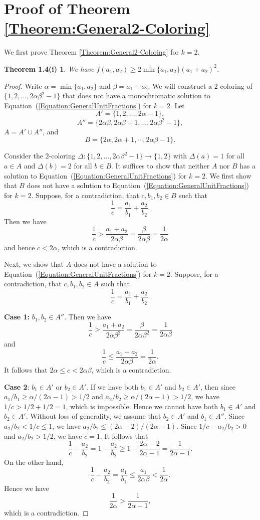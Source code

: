 \documentclass[10pt,a4paper]{amsart}
\newtheorem*{thm1.4PartI}{Theorem 1.4(i)}
\begin{document}
\section{Proof of Theorem \ref{Theorem:General2-Coloring}}\label{Section:GeneralTheorem2Coloring}
We first prove Theorem \ref{Theorem:General2-Coloring} for $k=2$.
\begin{thm1.4PartI}\label{Theorem:General2-Coloring_k=2}
    We have $f(a_1,a_2)\geq2\min\{a_1,a_2\}(a_1+a_2)^2$.
\end{thm1.4PartI}
\begin{proof}
    Write $\alpha=\min\{a_1,a_2\}$ and $\beta=a_1+a_2$. We will construct a $2$-coloring of $\{1,2,\ldots,2\alpha\beta^2-1\}$ that does not have a monochromatic solution to Equation~(\ref{Equation:GeneralUnitFractions}) for $k=2$. Let \[A'=\{1,2,\ldots,2\alpha-1\},\]
    \[
    A''=\{2\alpha\beta,2\alpha\beta+1,\ldots,2\alpha\beta^2-1\},
    \]
    $A=A'\cup A''$, and
    \[
    B=\{2\alpha,2\alpha+1,\cdots,2\alpha\beta-1\}.
    \]
    
    Consider the $2$-coloring $\Delta:\{1,2,\ldots,2\alpha\beta^2-1\}\to\{1,2\}$ with $\Delta(a)=1$ for all $a\in A$ and $\Delta(b)=2$ for all $b\in B$. It suffices to show that neither $A$ nor $B$ has a solution to Equation~(\ref{Equation:GeneralUnitFractions}) for $k=2$. We first show that $B$ does not have a solution to Equation~(\ref{Equation:GeneralUnitFractions}) for $k=2$. Suppose, for a contradiction, that $c,b_1,b_2\in B$ such that
    \[
    \frac{1}{c}=\frac{a_1}{b_1}+\frac{a_2}{b_2}.
    \]
    Then we have
    \[
    \frac{1}{c}>\frac{a_1+a_2}{2\alpha\beta}=\frac{\beta}{2\alpha\beta}=\frac{1}{2\alpha}
    \]
    and hence $c<2\alpha$, which is a contradiction.

    Next, we show that $A$ does not have a solution to Equation~(\ref{Equation:GeneralUnitFractions}) for $k=2$. Suppose, for a contradiction, that $c,b_1,b_2\in A$ such that
    \[
    \frac{1}{c}=\frac{a_1}{b_1}+\frac{a_2}{b_2}.
    \]

 {\bf Case 1:} $b_1,b_2\in A''$. Then we have
    \[
    \frac{1}{c}>\frac{a_1+a_2}{2\alpha\beta^2}=\frac{\beta}{2\alpha\beta^2}=\frac{1}{2\alpha\beta}
    \]
    and
    \[
    \frac{1}{c}\leq\frac{a_1+a_2}{2\alpha\beta}=\frac{1}{2\alpha}.
    \]
    It follows that $2\alpha\leq c<2\alpha\beta$, which is a contradiction.

{\bf Case 2}: $b_1\in A'$ or $b_2\in A'$. If we have both $b_1\in A'$ and $b_2\in A'$, then since $a_1/b_1\geq\alpha/(2\alpha-1)>1/2$ and $a_2/b_2\geq\alpha/(2\alpha-1)>1/2$, we have $1/c>1/2+1/2=1$, which is impossible. Hence we cannot have both $b_1\in A'$ and $b_2\in A'$. Without loss of generality, we assume that $b_2\in A'$ and $b_1\in A''$. Since $a_2/b_2<1/c\leq 1$, we have $a_2/b_2\leq (2\alpha-2)/(2\alpha-1)$. Since $1/c-a_2/b_2>0$ and $a_2/b_2>1/2$, we have $c=1$. It follows that
    \[
    \frac{1}{c}-\frac{a_2}{b_2}=1-\frac{a_2}{b_2}\geq1-\frac{2\alpha-2}{2\alpha-1}=\frac{1}{2\alpha-1}.
    \]
    On the other hand, 
    \[
    \frac{1}{c}-\frac{a_2}{b_2}=\frac{a_1}{b_1}\leq\frac{a_1}{2\alpha\beta}<\frac{1}{2\alpha}.
    \]
    Hence we have
    \[
    \frac{1}{2\alpha}>\frac{1}{2\alpha-1},
    \]
    which is a contradiction.
\end{proof}
\end{document}
